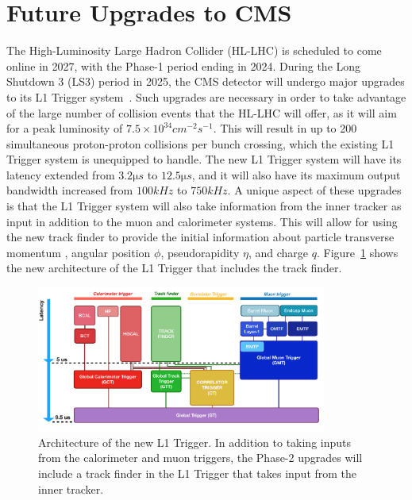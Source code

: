 \section{Future Upgrades to CMS}
\label{sec:CMSUpgrade}

The High-Luminosity Large Hadron Collider (HL-LHC) is scheduled to come online in 2027, with the Phase-1 period ending in 2024.
During the Long Shutdown 3 (LS3) period in 2025, the CMS detector will undergo major upgrades to its L1 Trigger system~\cite{CERN-LHCC-2020-004}.
Such upgrades are necessary in order to take advantage of the large number of collision events that the HL-LHC will offer, as it will aim for a peak luminosity of $7.5\times10^{34}\unit{cm^{-2}s^{-1}}$.
This will result in up to 200 simultaneous proton-proton collisions per bunch crossing, which the existing L1 Trigger system is unequipped to handle.
The new L1 Trigger system will have its latency extended from $3.2\unit{\micro s}$ to $12.5\unit{\micro s}$, and it will also have its maximum output bandwidth increased from $100\unit{kHz}$ to $750\unit{kHz}$.
A unique aspect of these upgrades is that the L1 Trigger system will also take information from the inner tracker as input in addition to the muon and calorimeter systems.
This will allow for using the new track finder to provide the initial information about particle transverse momentum \pt, angular position $\phi$, pseudorapidity $\eta$, and charge $q$.
Figure~\ref{fig:P2L1trigger} shows the new architecture of the L1 Trigger that includes the track finder.

\begin{figure}[htbp]
  \centering
  \includegraphics[width=0.85\textwidth]{fig/TPS/P2L1trigger.pdf}
  \caption{
    Architecture of the new L1 Trigger.
    In addition to taking inputs from the calorimeter and muon triggers, the Phase-2 upgrades will include a track finder in the L1 Trigger that takes input from the inner tracker.
  }
  \label{fig:P2L1trigger}
\end{figure}


